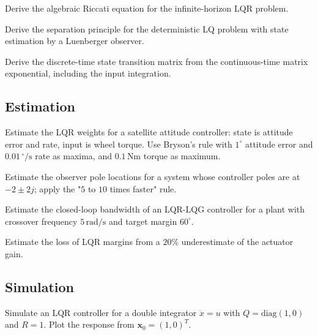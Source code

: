 \begin{exercise}
Derive the algebraic Riccati equation for the infinite-horizon LQR problem.
\end{exercise}

\begin{exercise}
Derive the separation principle for the deterministic LQ problem with state estimation by a Luenberger observer.
\end{exercise}

\begin{exercise}
Derive the discrete-time state transition matrix from the continuous-time matrix exponential, including the input integration.
\end{exercise}

\subsection*{Estimation}

\begin{exercise}
Estimate the LQR weights for a satellite attitude controller: state is attitude error and rate, input is wheel torque. Use Bryson's rule with $1^\circ$ attitude error and $0.01\,^\circ/\text{s}$ rate as maxima, and $0.1\,\text{Nm}$ torque as maximum.
\end{exercise}

\begin{exercise}
Estimate the observer pole locations for a system whose controller poles are at $-2 \pm 2j$; apply the "$5$ to $10$ times faster" rule.
\end{exercise}

\begin{exercise}
Estimate the closed-loop bandwidth of an LQR-LQG controller for a plant with crossover frequency $5\,\text{rad/s}$ and target margin $60^\circ$.
\end{exercise}

\begin{exercise}
Estimate the loss of LQR margins from a $20\%$ underestimate of the actuator gain.
\end{exercise}

\subsection*{Simulation}

\begin{exercise}
Simulate an LQR controller for a double integrator $\ddot{x} = u$ with $Q = \text{diag}(1, 0)$ and $R = 1$. Plot the response from $\mathbf{x}_0 = (1, 0)^T$.
\end{exercise}

